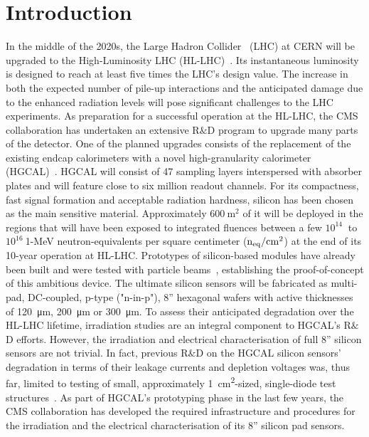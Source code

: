 \section{Introduction}
\label{sec:introduction}
In the middle of the 2020s, the Large Hadron Collider~\cite{evans:2008} (LHC) at CERN will be upgraded to the High-Luminosity LHC (HL-LHC)~\cite{hl-lhc-tdr:2017}.
Its instantaneous luminosity is designed to reach at least five times the LHC's design value.
The increase in both the expected number of pile-up interactions and the anticipated damage due to the enhanced radiation levels will pose significant challenges to the LHC experiments.
As preparation for a successful operation at the HL-LHC, the CMS~\cite{cms:2008} collaboration has undertaken an extensive R$\&$D program to upgrade many parts of the detector.
One of the planned upgrades consists of the replacement of the existing endcap calorimeters with a novel high-granularity calorimeter (HGCAL)~\cite{hgcal-tdr:2018}.
HGCAL will consist of 47 sampling layers interspersed with absorber plates and will feature close to six million readout channels.
For its compactness, fast signal formation and acceptable radiation hardness, silicon has been chosen as the main sensitive material.
Approximately $\SI{600}{\metre\squared}$ of it will be deployed in the regions that will have been exposed to integrated fluences between a few $10^{14}~$ to $10^{16}~$1-MeV neutron-equivalents per square centimeter ($\mathrm{n_{eq}}/\mathrm{cm}^{2}$) at the end of its 10-year operation at HL-LHC. 
Prototypes of silicon-based modules have already been built and were tested with particle beams~\cite{cms_hgc-2016-beamtests,H1:2020,H2:2020,H3:2021}, establishing the proof-of-concept of this ambitious device.
The ultimate silicon sensors will be fabricated as multi-pad, DC-coupled, p-type ("n-in-p"), 8'' hexagonal wafers with active thicknesses of \SI{120}{\micro\metre}, \SI{200}{\micro\metre} or \SI{300}{\micro\metre}.
To assess their anticipated degradation over the HL-LHC lifetime, irradiation studies are an integral component to HGCAL's R$\&$D efforts.
However, the irradiation and electrical characterisation of full 8'' silicon sensors are not trivial.
In fact, previous R$\&$D on the HGCAL silicon sensors' degradation in terms of their leakage currents and depletion voltages was, thus far, limited to testing of small, approximately \SI{1}{\centi\metre\squared}-sized, single-diode test structures~\cite{Curr_s_2017,Akchurin:2020}.
As part of HGCAL's prototyping phase in the last few years, the CMS collaboration has developed the required infrastructure and procedures for the irradiation and the electrical characterisation of its 8'' silicon pad sensors.
